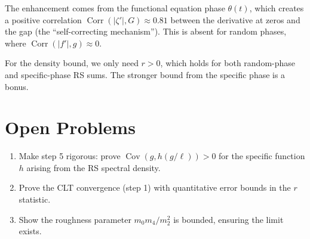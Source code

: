 \documentclass[11pt]{article}
\DeclareMathOperator{\Corr}{Corr}
\DeclareMathOperator{\Cov}{Cov}
\begin{document}
The enhancement comes from the functional equation phase $\theta(t)$, which creates
a positive correlation $\Corr(|\zeta'|, G) \approx 0.81$ between the derivative at zeros
and the gap (the ``self-correcting mechanism'').
This is absent for random phases, where $\Corr(|f'|, g) \approx 0$.

For the density bound, we only need $r > 0$, which holds for both random-phase
and specific-phase RS sums.
The stronger bound from the specific phase is a bonus.

\section{Open Problems}

\begin{enumerate}
\item Make step 5 rigorous: prove $\Cov(g, h(g/\ell)) > 0$ for the specific function $h$
arising from the RS spectral density.
\item Prove the CLT convergence (step 1) with quantitative error bounds in the $r$ statistic.
\item Show the roughness parameter $m_0 m_4/m_2^2$ is bounded, ensuring the limit exists.
\end{enumerate}
\end{document}
